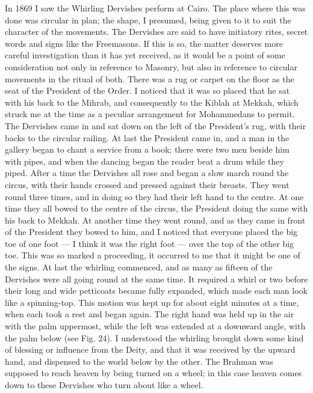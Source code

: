 \documentclass[a4paper, 11pt, oneside, polutonikogreek, english]{article}
\begin{document}
In 1869 I saw the Whirling Dervishes perform at Cairo. The place where this was done was circular in plan; the shape, I presumed, being given to it to suit the character of the movements. The Dervishes are said to have initiatory rites, secret words and signs like the Freemasons. If this is so, the matter deserves more careful investigation than it has yet received, as it would be a point of some consideration not only in reference to Masonry, but also in reference to circular movements in the ritual of both. There was a rug or carpet on the floor as the seat of the President of the Order. I noticed that it was so placed that he sat with his back to the Mihrab, and consequently to the Kiblah at Mekkah, which struck me at the time as a peculiar arrangement for Mohammedans to permit. The Dervishes came in and sat down on the left of the President's rug, with their backs to the circular railing. At last the President came in, and a man in the gallery began to chant a service from a book; there were two men beside him with pipes, and when the dancing began the reader beat a drum while they piped. After a time the Dervishes all rose and began a slow march round the circus, with their hands crossed and pressed against their breasts. They went round three times, and in doing so they had their left hand to the centre. At one time they all bowed to the centre of the circus, the President doing the same with his back to Mekkah. At another time they went round, and as they came in front of the President they bowed to him, and I noticed that everyone placed the big toe of one foot --- I think it was the right foot --- over the top of the other big toe. This was so marked a proceeding, it occurred to me that it might be one of the signs. At last the whirling commenced, and as many as fifteen of the Dervishes were all going round at the same time. It required a whirl or two before their long and wide petticoats became fully expanded, which made each man look like a spinning-top. This motion was kept up for about eight minutes at a time, when each took a rest and began again. The right hand was held up in the air with the palm uppermost, while the left was extended at a downward angle, with the palm below (see Fig. 24). I understood the whirling brought down some kind of blessing or influence from the Deity, and that it was received by the upward hand, and dispensed to the world below by the other. The Brahman was supposed to reach heaven by being turned on a wheel; in this case heaven comes down to these Dervishes who turn about like a wheel.
\end{document}
